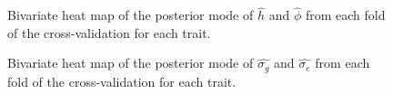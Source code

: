 \begin{figure}[h!]


\caption{\label{fig-gk-1}Bivariate heat map of the posterior mode of
\(\hat{h}\) and \(\hat{\phi}\) from each fold of the cross-validation
for each trait.}

\end{figure}%

\begin{figure}[h!]


\caption{\label{fig-gk-2}Bivariate heat map of the posterior mode of
\(\hat{\sigma_g}\) and \(\hat{\sigma_e}\) from each fold of the
cross-validation for each trait.}

\end{figure}

